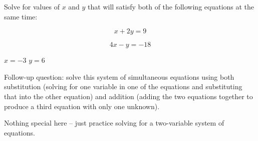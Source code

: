 

Solve for values of $x$ and $y$ that will satisfy both of the following equations at the same time:

$$x + 2y = 9$$

$$4x - y = -18$$







$x = -3$ \hskip 30pt $y = 6$

\vskip 10pt

Follow-up question: solve this system of simultaneous equations using both substitution (solving for one variable in one of the equations and substituting that into the other equation) and addition (adding the two equations together to produce a third equation with only one unknown).







Nothing special here -- just practice solving for a two-variable system of equations.




